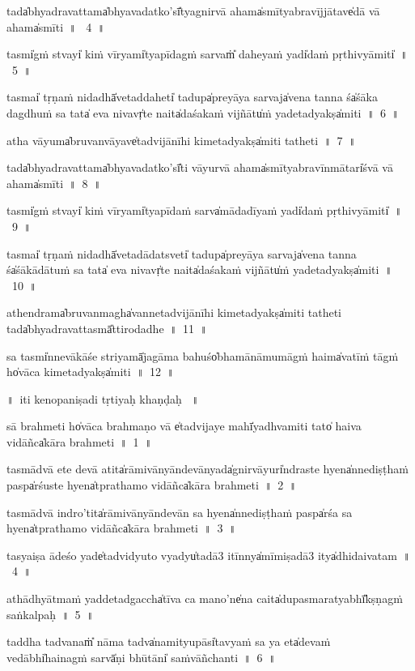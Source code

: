 \documentclass[parskip, DIV=14]{scrartcl}
\begin{document}
{tada̍bhyadrava॒ttama̍bhyavada॒tko'sī̎tyagni॒rvā a॒hama̍smītyabra॒vījjā॒tave̍dā vā a॒hama̍smīti~॥~ 4~॥

tasmi̍gṁ stvayi̍ kiṁ vī॒ryami̍tya॒pīdagṁ sarvaṁ̎ dahe॒yaṁ yadi̍daṁ pṛthi॒vyāmiti̍~॥~5~॥

tasmai̍ tṛṇaṁ ni॒dadhā̍vetadda॒heti̍ ta॒dupa̍preyāya sa॒rvaja̍vena ta॒nna śa̍śāka da॒gdhuṁ sa tata̍ eva ni॒vavṛ̍te naita̍daśakaṁ vi॒jñātu̍ṁ yadeta॒dyakṣa̍miti~॥~6~॥

atha vā॒yuma̍bruvanvā॒yave̍tadvi॒jānī॒hi ki॒meta॒dyakṣa̍miti tathe॒ti~॥~7~॥

tada̍bhyadrava॒ttama̍bhyavada॒tko'sī̎ti vāyu॒rvā a॒hama̍smītyabra॒vīnmā॒tari̍śvā vā a॒hama̍smī॒ti~॥~8~॥

tasmi̍gṁ stvayi̍ kiṁ vī॒ryami̍tya॒pīdaṁ sarva̍mādadī॒yaṁ yadi̍daṁ pṛthi॒vyāmiti̍~॥~9~॥

tasmai̍ tṛṇaṁ ni॒dadhā̍vetadā॒datsveti̍ ta॒dupa̍preyāya sa॒rvaja̍vena ta॒nna śa̍śākādā॒tuṁ sa tata̍ eva ni॒vavṛ̍te naita̍daśakaṁ vi॒jñātu̍ṁ yadeta॒dyakṣa̍miti~॥~10~॥

a॒thendrama̍bruvanma॒gha̍vanne॒tadvi॒jānī॒hi ki॒meta॒dyakṣa̍miti tathe॒ti tada̍bhyadrava॒ttasmā̎ttiroda॒dhe~॥~11~॥

sa tasmi̍nnevākā॒śe str॒iyamā̍jagāma ba॒huśo̍bhamānāmu॒mā॒gṁ haima̍vatīṁ tā॒gṁ ho̍vāca ki॒meta॒dyakṣa̍miti~॥~12~॥

\vspace{0.5cm}    
॥~iti kenopaniṣadi tṛtiyaḥ khaṇḍaḥ ~॥
\vspace{0.5cm}    

sā brahme॒ti ho̍vāca brahmaṇo॒ vā e̍tadvi॒jaye॒ mahī̍yadhvamiti tato̍ haiva vi॒dāñca̍kāra brahme॒ti~॥~1~॥

tasmā॒dvā e॒te de॒vā atita̍rāmi॒vānyā॒ndevā॒nyada̍gnirvā॒yuri̍ndraste hyena̍nnedi॒ṣṭhaṁ paspa̍rśu॒ste hyena̍tpratha॒mo vi॒dāñca̍kāra brahme॒ti~॥~2~॥

tasmā॒dvā i॒ndro'tita̍rāmi॒vānyā॒ndevā॒n sa hyena̍nnedi॒ṣṭhaṁ paspa̍rśa sa॒ hyena̍tpratha॒mo vi॒dāñca̍kāra brahme॒ti~॥~3~॥

ta॒syaiṣa āde॒śo yade̍tadvi॒dyuto॒ vyadyu̍tadā3 itīnnya̍mīmiṣadā3 itya̍dhidai॒vatam~॥~4~॥


athādhyā॒tmaṁ ya॒ddeta॒dgaccha̍tīva॒ ca॒ mano'ne̍na caita̍dupasmara॒tyabhī̎kṣṇagṁ saṅka॒lpaḥ~॥~5~॥

taddha॒ tadvanaṁ̎ nāma tadva̍namityu॒pāsi̍tavya॒ṁ sa॒ ya॒ eta̍devaṁ ve॒dābhi̍haina॒gṁ॒ sarvā̍ṇi bhū॒tāni̍ saṁvāñcha॒nti~॥~6~॥

}
\end{document}
